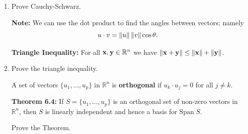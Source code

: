 \begin{enumerate}

\Problem Prove the Theorem.

\vfill

\begin{defn} The set $$W^{\perp} =\{ z \in \mathbb{R}^n: z \cdot w=0 \text{ for all } w \in W\}$$ is called the {\bf orthogonal complement} of $W$.
\end{defn}

\newpage

{\bf Note:} $x \in W^{\perp}$ if and only if $x$ is orthogonal to each vector in a set that spans $W$. Also $W^{\perp}$ is a subspace of $\mathbb{R}^n$.

\vfill

{\bf Theorem 6.3} Let $A$ be an $m\times n$ matrix, then $$(\text{Row}(A))^{\perp} = \text{Null}(A) \text{ and } (\text{Col}(A))^{\perp}= \text{Null}(A^{T}).$$

\Problem Prove the Theorem.

\vfill

{\bf Cauchy-Schwarz Inequality:} For all ${\bf x}, {\bf y} \in {\mathbb R}^n$ we have
$$ |{\bf x} \cdot {\bf y}| \le \|{\bf x}\| \ \|{\bf y}\|. $$

\item Prove Cauchy-Schwarz.

\vfill

{\bf Note:} We can use the dot product to find the angles between vectors; namely $$u\cdot v = \left\lVert u\right\rVert \left\lVert v\right\rVert \cos \theta.$$

{\bf Triangle Inequality:} For all ${\bf x}, {\bf y} \in {\mathbb R}^n$  we have $\|{\bf x}+{\bf y}\| \le \|{\bf x}\| + \|{\bf y} \| $.

\item Prove the triangle inequality.

\vfill

\newpage

\begin{defn}
	A set of vectors $\{ u_1, \dots, u_p\}$ in $\mathbb{R}^n$ is {\bf orthogonal} if $u_k \cdot u_j=0$ for all $j\neq k$.
\end{defn}

{\bf Theorem 6.4:} If $S=\{ u_1, \dots, u_p\}$ is an orthogonal set of non-zero vectors in $\mathbb{R}^n$, then $S$ is linearly independent and hence a basis for $\text{Span} \; S$.

\Problem Prove the Theorem.

\vfill


\end{enumerate}
